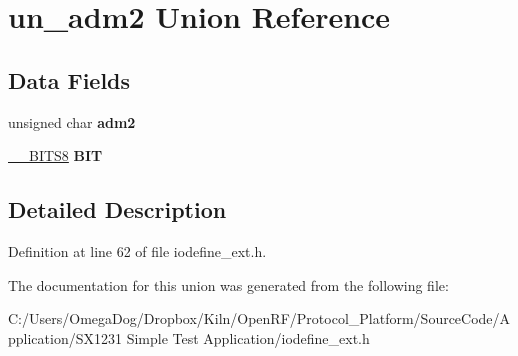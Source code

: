 \hypertarget{unionun__adm2}{\section{un\-\_\-adm2 Union Reference}
\label{unionun__adm2}
}
\subsection*{Data Fields}
\begin{DoxyCompactItemize}
\item 
\hypertarget{unionun__adm2_ad24cb85c668d14ed1be9004741e553a6}{unsigned char {\bfseries adm2}}\label{unionun__adm2_ad24cb85c668d14ed1be9004741e553a6}

\item 
\hypertarget{unionun__adm2_ab0dce9d2be33fbf0d98eff97aa41f5c5}{\hyperlink{struct_____b_i_t_s8}{\-\_\-\-\_\-\-B\-I\-T\-S8} {\bfseries B\-I\-T}}\label{unionun__adm2_ab0dce9d2be33fbf0d98eff97aa41f5c5}

\end{DoxyCompactItemize}


\subsection{Detailed Description}


Definition at line 62 of file iodefine\-\_\-ext.\-h.



The documentation for this union was generated from the following file\-:\begin{DoxyCompactItemize}
\item 
C\-:/\-Users/\-Omega\-Dog/\-Dropbox/\-Kiln/\-Open\-R\-F/\-Protocol\-\_\-\-Platform/\-Source\-Code/\-Application/\-S\-X1231 Simple Test Application/iodefine\-\_\-ext.\-h\end{DoxyCompactItemize}
